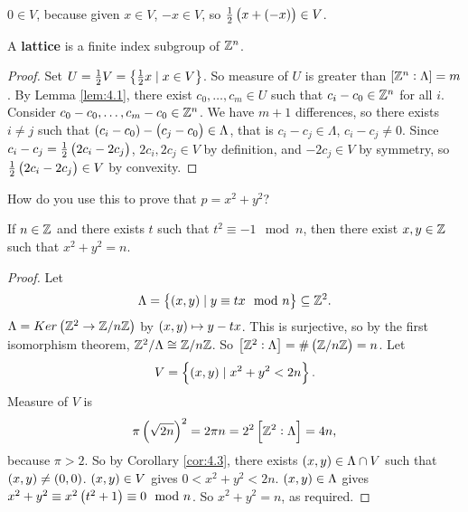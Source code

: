 \begin{remark}
$ 0 \in V $, because given $ x \in V $, $ -x \in V $, so $ \tfrac{1}{2}\br{x + \br{-x}} \in V $.
\end{remark}

A \textbf{lattice} is a finite index subgroup of $ \mathbb{Z}^n $.

\begin{proof}
Set $ U = \tfrac{1}{2}V = \cbr{\tfrac{1}{2}x \mid x \in V} $. So measure of $ U $ is greater than $ \sbr{\Z^n : \Lambda} = m $. By Lemma \ref{lem:4.1}, there exist $ c_0, \dots, c_m \in U $ such that $ c_i - c_0 \in \mathbb{Z}^n $ for all $ i $. Consider $ c_0 - c_0, \dots, c_m - c_0 \in \mathbb{Z}^n $. We have $ m + 1 $ differences, so there exists $ i \ne j $ such that $ \br{c_i - c_0} - \br{c_j - c_0} \in \Lambda $, that is $ c_i - c_j \in \Lambda $, $ c_i - c_j \ne 0 $. Since $ c_i - c_j = \tfrac{1}{2}\br{2c_i - 2c_j} $, $ 2c_i, 2c_j \in V $ by definition, and $ -2c_j \in V $ by symmetry, so $ \tfrac{1}{2}\br{2c_i - 2c_j} \in V $ by convexity.
\end{proof}

How do you use this to prove that $ p = x^2 + y^2 $?

\pagebreak


\begin{theorem}
If $ n \in \mathbb{Z} $ and there exists $ t $ such that $ t^2 \equiv -1 \mod n $, then there exist $ x, y \in \mathbb{Z} $ such that $ x^2 + y^2 = n $.
\end{theorem}

\begin{proof}
Let
$$ \Lambda = \cbr{\br{x, y} \mid y \equiv tx \mod n} \subseteq \Z^2. $$
$ \Lambda = Ker\br{\Z^2 \to \Z / n\Z} $ by $ \br{x, y} \mapsto y - tx $. This is surjective, so by the first isomorphism theorem, $ \mathbb{Z}^2 / \Lambda \cong \mathbb{Z} / n\mathbb{Z} $. So $ \sbr{\Z^2 : \Lambda} = \#\br{\Z / n\Z} = n $. Let
$$ V = \cbr{\br{x, y} \mid x^2 + y^2 < 2n}. $$
Measure of $ V $ is
$$ \pi\br{\sqrt{2n}}^2 = 2\pi n = 2^2\sbr{\Z^2 : \Lambda} = 4n, $$
because $ \pi > 2 $. So by Corollary \ref{cor:4.3}, there exists $ \br{x, y} \in \Lambda \cap V $ such that $ \br{x, y} \ne \br{0, 0} $. $ \br{x, y} \in V $ gives $ 0 < x^2 + y^2 < 2n $. $ \br{x, y} \in \Lambda $ gives $ x^2 + y^2 \equiv x^2\br{t^2 + 1} \equiv 0 \mod n $. So $ x^2 + y^2 = n $, as required.
\end{proof}

